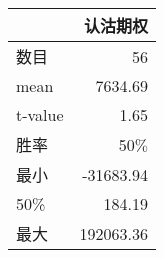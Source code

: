 \begin{tabular}{lr}
\toprule
{} &              认沽期权 \\
\midrule
数目 &      56\\
mean  &    7634.69 \\
t-value   &   1.65\\
胜率 & 50$\%$\\
最小   &  -31683.94 \\
50\%   &     184.19 \\
最大  &  192063.36 \\
\bottomrule
\end{tabular}
